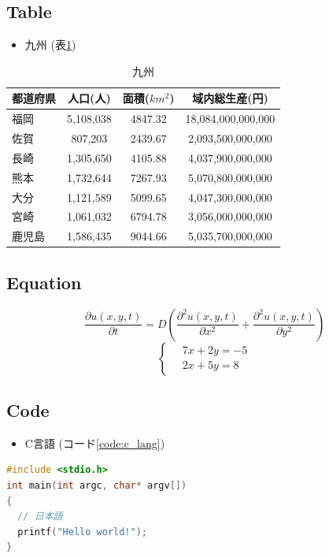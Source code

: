 \subsection{Table}
\begin{itemize}
  \item 九州 (表\ref{table:kyusyu})
\end{itemize}
\begin{table}[htbp]
  \centering
  \caption{九州}
  \label{table:kyusyu}
  \begin{tabular}{|l|c|c|c|}
    \hline
    都道府県 & 人口(人)  & 面積(\(km^2\)) & 域内総生産(円)  \\ \hline \hline
    福岡     & 5,108,038 & 4847.32        & 18,084,000,000,000 \\ \hline
    佐賀     &   807,203 & 2439.67        &  2,093,500,000,000 \\ \hline
    長崎     & 1,305,650 & 4105.88        &  4,037,900,000,000 \\ \hline
    熊本     & 1,732,644 & 7267.93        &  5,070,800,000,000 \\ \hline
    大分     & 1,121,589 & 5099.65        &  4,047,300,000,000 \\ \hline
    宮崎     & 1,061,032 & 6794.78        &  3,056,000,000,000 \\ \hline
    鹿児島   & 1,586,435 & 9044.66        &  5,035,700,000,000 \\ \hline
  \end{tabular}
\end{table}

\subsection{Equation}
\begin{equation}
  \frac{\partial u\left(x,y,t\right)}{\partial t}
  = D \left(\frac{{\partial}^2 u\left(x,y,t\right)}{\partial{x}^2}
  + \frac{\partial^2 u\left(x,y,t\right)}{\partial y^2}\right)
\end{equation}
\begin{equation}
  \left\{ \,
  \begin{aligned}
    & 7x + 2y = -5 \\
    & 2x + 5y = 8
  \end{aligned}
  \right.
\end{equation}

\subsection{Code}
\begin{itemize}
  \item C言語 (コード\ref{code:c_lang})
\end{itemize}
\begin{lstlisting}[language={c},caption={C言語},label={code:c_lang}]
#include <stdio.h>
int main(int argc, char* argv[])
{
  // 日本語
  printf("Hello world!");
}
\end{lstlisting}

